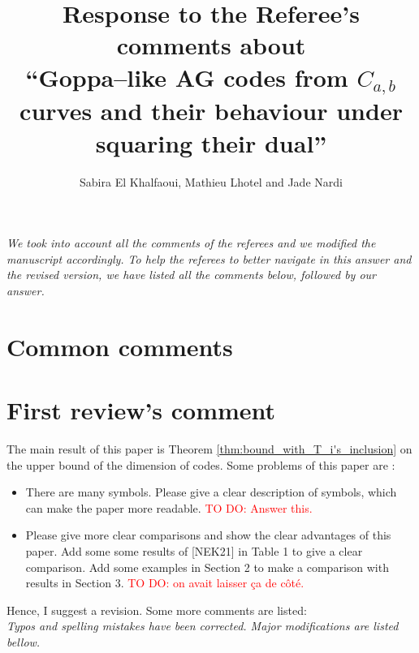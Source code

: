 \documentclass[12pt,a4paper]{amsart}
\title[Goppa--like AG codes from $C_{a,b}$ curves and their behaviour under squaring their dual]{Response to the Referee's comments about  \\ ``Goppa--like AG codes from $C_{a,b}$ curves and their behaviour under squaring their dual''}
\author{Sabira El Khalfaoui, Mathieu Lhotel and Jade Nardi}
\newcommand\TODO[1]{\textcolor{red}{TO DO: #1}}
\begin{document}
\maketitle

\textit{We took into account all the comments of the referees and we modified the manuscript accordingly. To help the referees to better navigate in this answer and the revised version, we have listed all the comments below, followed by our answer.} 

\section*{Common comments}
 
\section*{First review's comment}

The main result of this paper is Theorem \ref{thm:bound_with_T_i's_inclusion} on the upper bound of the dimension of codes. Some problems
of this paper are :
\begin{itemize}
\item  There are many symbols. Please give a clear description of symbols, which can make the paper more
readable. \TODO{Answer this.}
\item  Please give more clear comparisons and show the clear advantages of this paper. Add some some results of [NEK21] in Table 1 to give a clear comparison. Add some examples in Section 2 to make a comparison with results in Section 3. \TODO{on avait laisser ça de côté.}
\end{itemize}

Hence, I suggest a revision. Some more comments are listed: \\

\textit{Typos and spelling mistakes have been corrected. Major modifications are listed bellow.} \\
\end{document}
